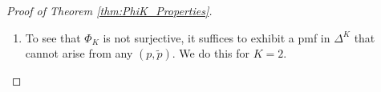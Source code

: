 \documentclass{article}
\begin{document}
\begin{proof}[Proof of Theorem \ref{thm:PhiK_Properties}]
\begin{enumerate}[label=(\roman*)]
    
    
    
    
    
    
    \item To see that \(\Phi_K\) is not surjective, it suffices to exhibit a pmf in \(\Delta^K\) that cannot arise from any \((p,\tilde p)\).  We do this for \(K=2\).


\end{enumerate}
\end{proof}
\end{document}

